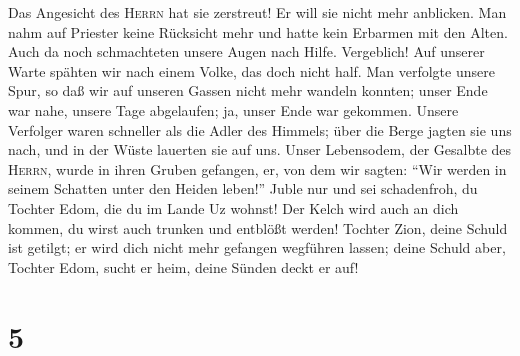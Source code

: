  Das Angesicht des \textsc{Herrn} hat sie zerstreut! Er
will sie nicht mehr anblicken. Man nahm auf Priester keine Rücksicht
mehr und hatte kein Erbarmen mit den Alten.  Auch da noch
schmachteten unsere Augen nach Hilfe. Vergeblich! Auf unserer Warte
spähten wir nach einem Volke, das doch nicht half.  Man
verfolgte unsere Spur, so daß wir auf unseren Gassen nicht mehr wandeln
konnten; unser Ende war nahe, unsere Tage abgelaufen; ja, unser Ende war
gekommen.  Unsere Verfolger waren schneller als die Adler
des Himmels; über die Berge jagten sie uns nach, und in der Wüste
lauerten sie auf uns.  Unser Lebensodem, der Gesalbte des
\textsc{Herrn}, wurde in ihren Gruben gefangen, er, von dem wir sagten:
``Wir werden in seinem Schatten unter den Heiden leben!''
 Juble nur und sei schadenfroh, du Tochter Edom, die du
im Lande Uz wohnst! Der Kelch wird auch an dich kommen, du wirst auch
trunken und entblößt werden!  Tochter Zion, deine Schuld
ist getilgt; er wird dich nicht mehr gefangen wegführen lassen; deine
Schuld aber, Tochter Edom, sucht er heim, deine Sünden deckt er auf!

\hypertarget{section-4}{%
\section{5}\label{section-4}}

